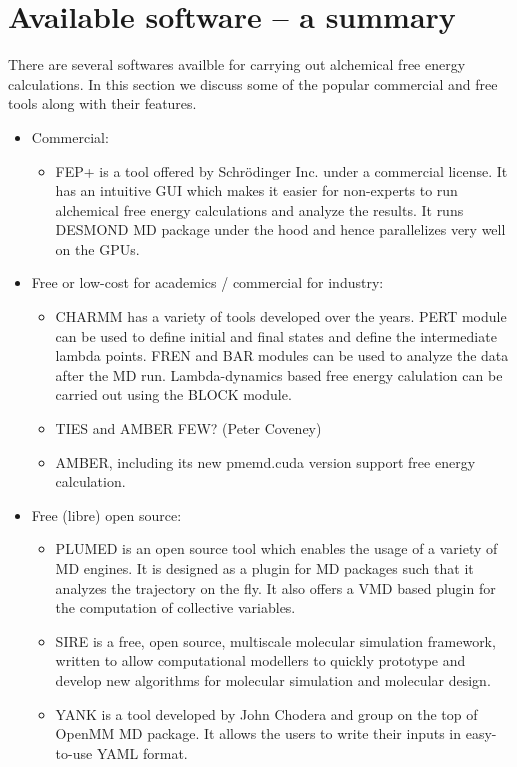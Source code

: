 \documentclass[9pt,bestpractices]{livecoms}
\begin{document}
\section{Available software -- a summary}
\label{sec:software}
There are several softwares availble for carrying out alchemical free energy calculations. In this section we discuss some of the popular commercial and free tools along with their features. 
\begin{itemize}
\item Commercial:
   \begin{itemize}
    \item FEP+ is a tool offered by Schr\"{o}dinger Inc. under a commercial license. It has an intuitive GUI which makes it easier for non-experts to run alchemical free energy calculations and analyze the results. It runs DESMOND MD package under the hood and hence parallelizes very well on the GPUs. 
    \end{itemize}
\item Free or low-cost for academics / commercial for industry:
	\begin{itemize}
	\item CHARMM has a variety of tools developed over the years. PERT module can be used to define initial and final states and define the intermediate lambda points. FREN and BAR modules can be used to analyze the data after the MD run. Lambda-dynamics based free energy calulation can be carried out using the BLOCK module.  
	\item TIES and AMBER FEW? (Peter Coveney)
	\item AMBER, including its new pmemd.cuda version support free energy calculation. 
	\end{itemize}
\item Free (libre) open source:
	\begin{itemize}
	\item PLUMED is an open source tool which enables the usage of a variety of MD engines. It is designed as a plugin for MD packages such that it analyzes the trajectory on the fly. It also offers a VMD based plugin for the computation of collective variables.   	
	\item SIRE  is a free, open source, multiscale molecular simulation framework, written to allow computational modellers to quickly prototype and develop new algorithms for molecular simulation and molecular design. 
	\item YANK is a tool developed by John Chodera and group on the top of OpenMM MD package. It allows the users to write their inputs in easy-to-use YAML format.

\end{itemize}
\end{itemize}
\end{document}

